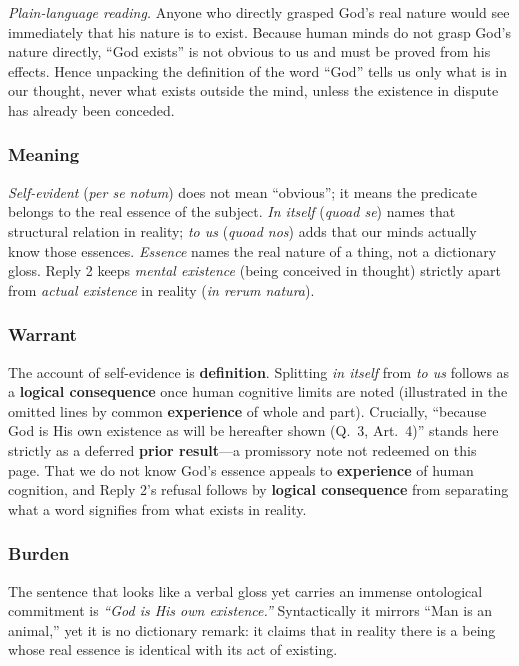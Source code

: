 \emph{Plain-language reading.} Anyone who directly grasped God's real nature would see immediately that his nature is to exist. Because human minds do not grasp God's nature directly, ``God exists'' is not obvious to us and must be proved from his effects. Hence unpacking the definition of the word ``God'' tells us only what is in our thought, never what exists outside the mind, unless the existence in dispute has already been conceded.

\subsubsection*{Meaning}
\emph{Self-evident} (\emph{per se notum}) does not mean ``obvious''; it means the predicate belongs to the real essence of the subject. \emph{In itself} (\emph{quoad se}) names that structural relation in reality; \emph{to us} (\emph{quoad nos}) adds that our minds actually know those essences. \emph{Essence} names the real nature of a thing, not a dictionary gloss. Reply 2 keeps \emph{mental existence} (being conceived in thought) strictly apart from \emph{actual existence} in reality (\emph{in rerum natura}).

\subsubsection*{Warrant}
The account of self-evidence is \textbf{definition}. Splitting \emph{in itself} from \emph{to us} follows as a \textbf{logical consequence} once human cognitive limits are noted (illustrated in the omitted lines by common \textbf{experience} of whole and part). Crucially, ``because God is His own existence as will be hereafter shown (Q.\ 3, Art.\ 4)'' stands here strictly as a deferred \textbf{prior result}---a promissory note not redeemed on this page. That we do not know God's essence appeals to \textbf{experience} of human cognition, and Reply 2's refusal follows by \textbf{logical consequence} from separating what a word signifies from what exists in reality.

\subsubsection*{Burden}
The sentence that looks like a verbal gloss yet carries an immense ontological commitment is \emph{``God is His own existence.''} Syntactically it mirrors ``Man is an animal,'' yet it is no dictionary remark: it claims that in reality there is a being whose real essence is identical with its act of existing.

